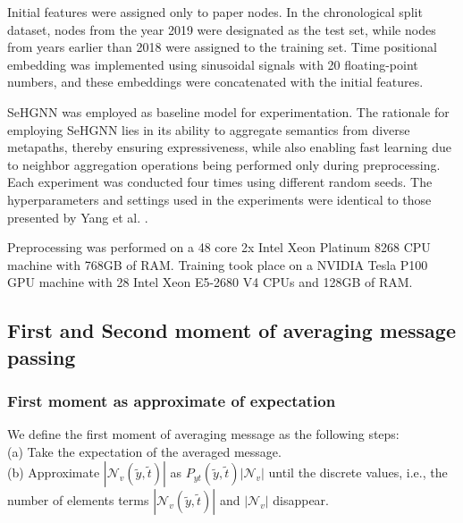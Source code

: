 Initial features were assigned only to paper nodes. In the chronological split dataset, nodes from the year 2019 were designated as the test set, while nodes from years earlier than 2018 were assigned to the training set. Time positional embedding was implemented using sinusoidal signals with 20 floating-point numbers, and these embeddings were concatenated with the initial features.





SeHGNN \cite{SeHGNN} was employed as baseline model for experimentation. The rationale for employing SeHGNN lies in its ability to aggregate semantics from diverse metapaths, thereby ensuring expressiveness, while also enabling fast learning due to neighbor aggregation operations being performed only during preprocessing. Each experiment was conducted four times using different random seeds. The hyperparameters and settings used in the experiments were identical to those presented by Yang et al. \cite{SeHGNN}.


Preprocessing was performed on a 48 core 2x Intel Xeon Platinum 8268 CPU machine with 768GB of RAM. Training took place on a NVIDIA Tesla P100 GPU machine with 28 Intel Xeon E5-2680 V4 CPUs and 128GB of RAM.





\subsection{First and Second moment of averaging message passing}\label{apdx:firstmm}
\subsubsection{First moment as approximate of expectation}
We define the first moment of averaging message as the following steps: \\

(a) Take the expectation of the averaged message. \\
(b) Approximate $|\mathcal{N}_{v}\left(\tilde{y}, \tilde{t}\right)|$ as $P_{yt}\left(\tilde{y}, \tilde{t}\right)|\mathcal{N}_{v}|$ until the discrete values, i.e., the number of elements terms $|\mathcal{N}_{v}\left(\tilde{y}, \tilde{t}\right)|$ and $|\mathcal{N}_{v}|$ disappear. \\

